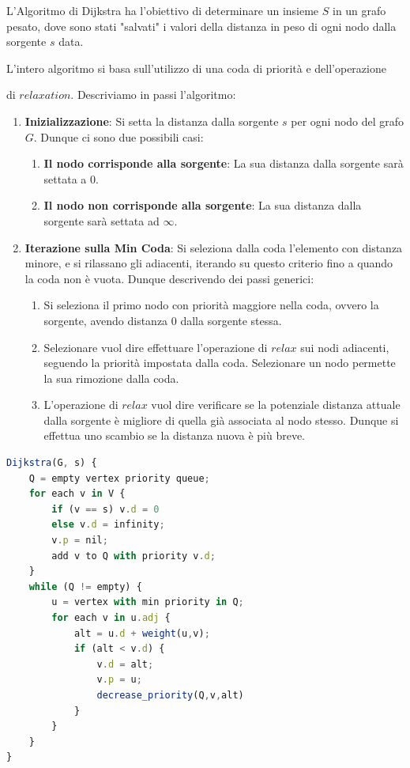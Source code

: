 \documentclass{article}
\begin{document}
L'Algoritmo di Dijkstra ha l'obiettivo di determinare un insieme $S$ in un grafo pesato, dove sono stati "salvati" i valori della distanza in peso di ogni nodo dalla sorgente $s$ data.

L'intero algoritmo si basa sull'utilizzo di una coda di priorità e dell'operazione

di $relaxation$. Descriviamo in passi l'algoritmo:

\begin{enumerate}
    \item \textbf{Inizializzazione}: Si setta la distanza dalla sorgente $s$ per ogni nodo del grafo $G$. Dunque ci sono due possibili casi:
    \begin{enumerate}
        \item \textbf{Il nodo corrisponde alla sorgente}: La sua distanza dalla sorgente sarà settata a 0.
        \item \textbf{Il nodo non corrisponde alla sorgente}: La sua distanza dalla sorgente sarà settata ad $\infty$.
    \end{enumerate}
    \item \textbf{Iterazione sulla Min Coda}: Si seleziona dalla coda l'elemento con distanza minore, e si rilassano gli adiacenti, iterando su questo criterio fino a quando la coda non è vuota. Dunque descrivendo dei passi generici:
    \begin{enumerate}
        \item Si seleziona il primo nodo con priorità maggiore nella coda, ovvero la sorgente, avendo distanza 0 dalla sorgente stessa.
        \item Selezionare vuol dire effettuare l'operazione di $relax$ sui nodi adiacenti, seguendo la priorità impostata dalla coda. Selezionare un nodo permette la sua rimozione dalla coda.
        \item L'operazione di $relax$ vuol dire verificare se la potenziale distanza attuale dalla sorgente è migliore di quella già associata al nodo stesso. Dunque si effettua uno scambio se la distanza nuova è più breve.
    \end{enumerate}
\end{enumerate}

\begin{lstlisting}[language=JavaScript]
Dijkstra(G, s) {
    Q = empty vertex priority queue;
    for each v in V {
        if (v == s) v.d = 0
        else v.d = infinity;
        v.p = nil;
        add v to Q with priority v.d;
    }
    while (Q != empty) {
        u = vertex with min priority in Q;
        for each v in u.adj {
            alt = u.d + weight(u,v);
            if (alt < v.d) {
                v.d = alt;
                v.p = u;
                decrease_priority(Q,v,alt)
            }
        }
    }
}
\end{lstlisting}
\end{document}
